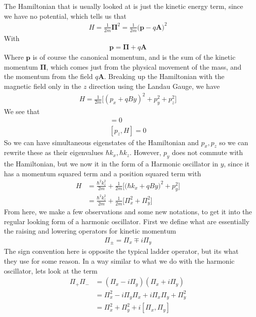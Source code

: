 The Hamiltonian that is usually looked at is just the kinetic energy term, since we have no potential, which tells us that
\begin{align}
H = \frac{1}{2m}\boldsymbol{\Pi}^2 = \frac{1}{2m}\Big(\textbf{p}-q\textbf{A}\Big)^2
\end{align}
With
\begin{align}
\textbf{p} = \boldsymbol{\Pi} + q\textbf{A}
\end{align}
Where $\textbf{p}$ is of course the canonical momentum, and is the sum of the kinetic momentum $\boldsymbol{\Pi}$, which comes just from the physical movement of the mass, and the momentum from the field $q\textbf{A}$. Breaking up the Hamiltonian with the magnetic field only in the $z$ direction using the Landau Gauge, we have
\begin{align}
H = \frac{1}{2m}\Big[ (p_x+qBy)^2 + p_y^2 + p_z^2\Big]
\end{align}
We see that 
\begin{align}
[p_x, H] = 0\\
[p_z, H] = 0
\end{align}
So we can have simultaneous eigenstates of the Hamiltonian and $p_x,p_z$ so we can rewrite these as their eigenvalues $\hbar k_x, \hbar k_z$. However, $p_y$ does not commute with the Hamiltonian, but we now it in the form of a Harmonic oscillator in $y$, since it has a momentum squared term and a position squared term with
\begin{align}
H &= \frac{\hbar^2k_z^2}{2m} + \frac{1}{2m}\Big[\Big(\hbar k_x + qBy\Big)^2 + p_y^2\Big]\\
&=\frac{\hbar^2k_z^2}{2m} + \frac{1}{2m}\Big[\Pi_x^2 + \Pi_y^2\Big]
\end{align}
From here, we make a few observations and some new notations, to get it into the regular looking form of a harmonic oscillator. First we define what are essentially the raising and lowering operators for kinetic momentum
\begin{align}
    \Pi_\pm = \Pi_x \mp i\Pi_y
\end{align}
The sign convention here is opposite the typical ladder operator, but its what they use for some reason. In a way similar to what we do with the harmonic oscillator, lets look at the term
\begin{align}
    \Pi_+\Pi_- &= (\Pi_x - i\Pi_y)(\Pi_x + i\Pi_y)\\ 
    &= \Pi_x^2 - i\Pi_y\Pi_x +i\Pi_x\Pi_y +\Pi_y^2\\ 
    &= \Pi_x^2 + \Pi_y^2 + i[\Pi_x,\Pi_y]
\end{align}
